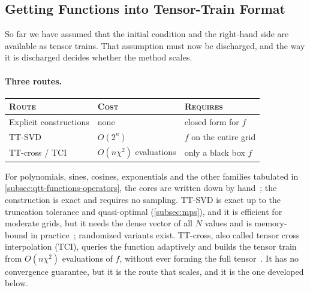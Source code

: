 
\subsection{Getting Functions into Tensor-Train Format}
\label{subsec:finding-qtt}

So far we have assumed that the initial condition and the right-hand side are
available as tensor trains. That assumption must now be discharged, and the way
it is discharged decides whether the method scales.

\paragraph{Three routes.}
\begin{center}
  \begin{tabular}{@{}lll@{}}
    \toprule
    \textsc{Route} & \textsc{Cost} & \textsc{Requires} \\
    \midrule
    Explicit constructions & none                        & closed form for $f$ \\
    TT-SVD                 & $O(2^n)$                    & $f$ on the entire grid \\
    TT-cross / TCI         & $O(n\chi^2)$ evaluations    & only a black box $f$ \\
    \bottomrule
  \end{tabular}
\end{center}
For polynomials, sines, cosines, exponentials and the other families tabulated
in \cref{subsec:qtt-functions-operators}, the cores are written down by
hand~\cite{Oseledets2013}; the construction is exact and requires no sampling.
TT-SVD is exact up to the truncation tolerance and quasi-optimal
(\cref{subsec:mps}), and it is efficient for moderate grids, but it needs the
dense vector of all $N$ values and is memory-bound in
practice~\cite{Roehrig2022}; randomized variants exist. TT-cross, also called
tensor cross interpolation (TCI), queries the function adaptively and builds the
tensor train from $O(n\chi^2)$ evaluations of $f$, without ever forming the full
tensor~\cite{Oseledets2010}. It has no convergence guarantee, but it is the
route that scales, and it is the one developed below.


